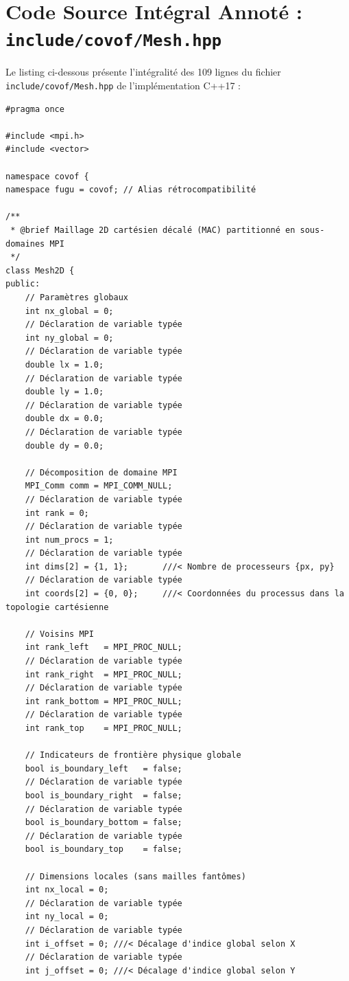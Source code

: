 \documentclass[10pt,a4paper,oneside]{book}
\begin{document}
\section{Code Source Intégral Annoté : \texttt{include/covof/Mesh.hpp}}
Le listing ci-dessous présente l'intégralité des 109 lignes du fichier \texttt{include/covof/Mesh.hpp} de l'implémentation C++17 :

\begin{lstlisting}[language={[11]C++}]
#pragma once

#include <mpi.h>
#include <vector>

namespace covof {
namespace fugu = covof; // Alias rétrocompatibilité

/**
 * @brief Maillage 2D cartésien décalé (MAC) partitionné en sous-domaines MPI
 */
class Mesh2D {
public:
    // Paramètres globaux
    int nx_global = 0;
    // Déclaration de variable typée
    int ny_global = 0;
    // Déclaration de variable typée
    double lx = 1.0;
    // Déclaration de variable typée
    double ly = 1.0;
    // Déclaration de variable typée
    double dx = 0.0;
    // Déclaration de variable typée
    double dy = 0.0;

    // Décomposition de domaine MPI
    MPI_Comm comm = MPI_COMM_NULL;
    // Déclaration de variable typée
    int rank = 0;
    // Déclaration de variable typée
    int num_procs = 1;
    // Déclaration de variable typée
    int dims[2] = {1, 1};       ///< Nombre de processeurs {px, py}
    // Déclaration de variable typée
    int coords[2] = {0, 0};     ///< Coordonnées du processus dans la topologie cartésienne

    // Voisins MPI
    int rank_left   = MPI_PROC_NULL;
    // Déclaration de variable typée
    int rank_right  = MPI_PROC_NULL;
    // Déclaration de variable typée
    int rank_bottom = MPI_PROC_NULL;
    // Déclaration de variable typée
    int rank_top    = MPI_PROC_NULL;

    // Indicateurs de frontière physique globale
    bool is_boundary_left   = false;
    // Déclaration de variable typée
    bool is_boundary_right  = false;
    // Déclaration de variable typée
    bool is_boundary_bottom = false;
    // Déclaration de variable typée
    bool is_boundary_top    = false;

    // Dimensions locales (sans mailles fantômes)
    int nx_local = 0;
    // Déclaration de variable typée
    int ny_local = 0;
    // Déclaration de variable typée
    int i_offset = 0; ///< Décalage d'indice global selon X
    // Déclaration de variable typée
    int j_offset = 0; ///< Décalage d'indice global selon Y


\end{lstlisting}
\end{document}
